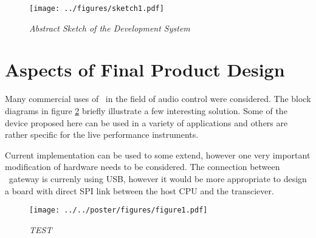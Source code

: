 \begin{figure}
\centering
\texttt{[image: ../figures/sketch1.pdf]}
\caption{\emph{Abstract Sketch of the Development System}} \label{fig:sketch1}
\end{figure}


\pagebreak
\section{Aspects of Final Product Design}

   Many commercial uses of \WPAN\ in the field of audio control were
 considered. The block diagrams in figure \ref{fig:products} briefly
 illustrate a few interesting solution. Some of the device proposed
 here can be used in a variety of applications and others are rather
 specific for the live performance instruments.

  Current implementation can be used to some extend, however one
 very important modification of hardware needs to be considered.
 The connection between \WPAN\ gateway is currenly using USB,
 however it would be more appropriate to design a board with
 direct SPI link between the host CPU and the transciever.

\begin{figure}
\centering
\texttt{[image: ../../poster/figures/figure1.pdf]}
\caption{\emph{TEST}} \label{fig:products}
\end{figure}
